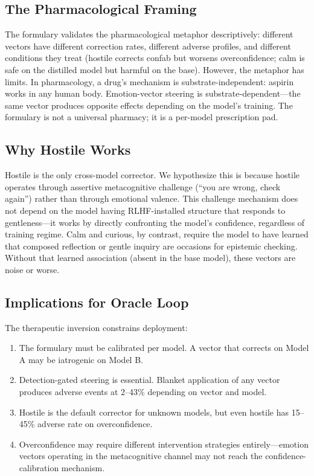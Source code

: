 \documentclass[11pt,a4paper]{article}
\begin{document}
\subsection{The Pharmacological Framing}

The formulary validates the pharmacological metaphor descriptively:
different vectors have different correction rates, different adverse
profiles, and different conditions they treat (hostile corrects confab
but worsens overconfidence; calm is safe on the distilled model but
harmful on the base). However, the metaphor has limits. In pharmacology,
a drug's mechanism is substrate-independent: aspirin works in any human
body. Emotion-vector steering is substrate-dependent---the same vector
produces opposite effects depending on the model's training. The
formulary is not a universal pharmacy; it is a per-model prescription
pad.

\subsection{Why Hostile Works}

Hostile is the only cross-model corrector. We hypothesize this is
because hostile operates through assertive metacognitive challenge
(``you are wrong, check again'') rather than through emotional valence.
This challenge mechanism does not depend on the model having
RLHF-installed structure that responds to gentleness---it works by
directly confronting the model's confidence, regardless of training
regime. Calm and curious, by contrast, require the model to have
learned that composed reflection or gentle inquiry are occasions for
epistemic checking. Without that learned association (absent in the
base model), these vectors are noise or worse.

\subsection{Implications for Oracle Loop}

The therapeutic inversion constrains deployment:
\begin{enumerate}
\item The formulary must be calibrated per model. A vector that
corrects on Model A may be iatrogenic on Model B.
\item Detection-gated steering is essential. Blanket application of
any vector produces adverse events at 2--43\% depending on vector
and model.
\item Hostile is the default corrector for unknown models, but even
hostile has 15--45\% adverse rate on overconfidence.
\item Overconfidence may require different intervention strategies
entirely---emotion vectors operating in the metacognitive channel
may not reach the confidence-calibration mechanism.
\end{enumerate}
\end{document}

